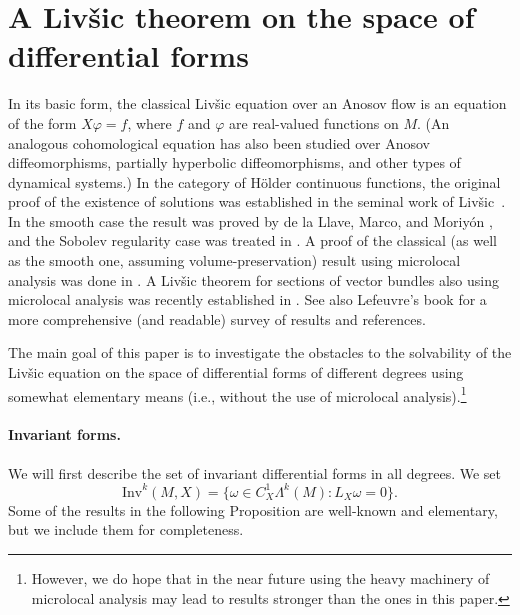 \documentclass[11pt,letterpaper,reqno,abstract=true]{scrartcl}
\theoremstyle{plain}                              %
\theoremstyle{definition}                         %
\theoremstyle{remark}                             %
\begin{document}
% 


\section{A Liv\v{s}ic theorem on the space of differential forms}
\label{sec:livshitz}

In its basic form, the classical Liv\v{s}ic equation over an Anosov
flow is an equation of the form $X\varphi = f$, where $f$ and
$\varphi$ are real-valued functions on $M$. (An analogous
cohomological equation has also been studied over Anosov
diffeomorphisms, partially hyperbolic diffeomorphisms, and other types
of dynamical systems.) In the category of H\"older continuous
functions, the original proof of the existence of solutions was
established in the seminal work of Liv\v{s}ic~\cite{livsic+71,
  livsic+72}. In the smooth case the result was proved by de la Llave,
Marco, and Moriy\'on \cite{L+M+M+86}, and the Sobolev regularity case
was treated in \cite{dll01}. A proof of the classical (as well as the
smooth one, assuming volume-preservation) result using microlocal
analysis was done in \cite{guillarmou+2017}. A Liv\v{s}ic theorem for
sections of vector bundles also using microlocal analysis was recently
established in \cite{cekic+lefeuvre+2025}. See also Lefeuvre's book
\cite{lefeuvre_book+2025} for a more comprehensive (and readable)
survey of results and references.


The main goal of this paper is to investigate the obstacles to the
solvability of the Liv\v{s}ic equation on the space of differential
forms of different degrees using somewhat elementary means (i.e.,
without the use of microlocal analysis).\footnote{However, we do hope
  that in the near future using the heavy machinery of microlocal
  analysis may lead to results stronger than the ones in this paper.}


\paragraph{Invariant forms.} We will first describe the set of
invariant differential forms in all degrees. We set
%
\begin{displaymath}
  \text{Inv}^k(M,X) = \{ \omega \in C^1_X \Lambda^k(M) : L_X \omega = 0 \}.
\end{displaymath}
%
Some of the results in the following Proposition are well-known and
elementary, but we include them for completeness.
\end{document}
